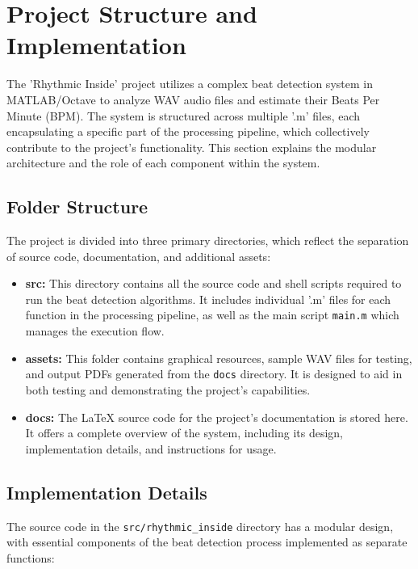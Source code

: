 \section{Project Structure and Implementation}

The 'Rhythmic Inside' project utilizes a complex beat detection system in MATLAB/Octave to analyze WAV audio files and estimate their Beats Per Minute (BPM). The system is structured across multiple '.m' files, each encapsulating a specific part of the processing pipeline, which collectively contribute to the project's functionality. This section explains the modular architecture and the role of each component within the system.

\subsection{Folder Structure}
The project is divided into three primary directories, which reflect the separation of source code, documentation, and additional assets:
\begin{itemize}
    \item \textbf{src:} This directory contains all the source code and shell scripts required to run the beat detection algorithms. It includes individual '.m' files for each function in the processing pipeline, as well as the main script \texttt{main.m} which manages the execution flow.
    \item \textbf{assets:} This folder contains graphical resources, sample WAV files for testing, and output PDFs generated from the \texttt{docs} directory. It is designed to aid in both testing and demonstrating the project's capabilities.
    \item \textbf{docs:} The LaTeX source code for the project's documentation is stored here. It offers a complete overview of the system, including its design, implementation details, and instructions for usage.
\end{itemize}

\subsection{Implementation Details}
The source code in the \texttt{src/rhythmic\_inside} directory has a modular design, with essential components of the beat detection process implemented as separate functions:


